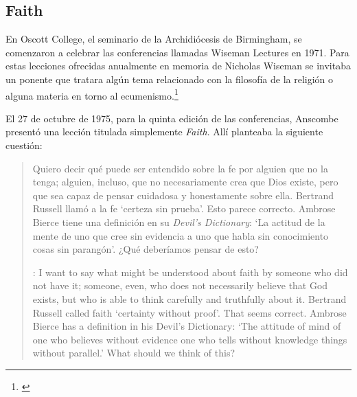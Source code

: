 \subsection{Faith}

En Oscott College, el seminario de la Archidiócesis de Birmingham, se comenzaron a celebrar las conferencias llamadas Wiseman Lectures en 1971. Para estas lecciones ofrecidas anualmente en memoria de Nicholas Wiseman se invitaba un ponente que tratara algún tema relacionado con la filosofía de la religión o alguna materia en torno al ecumenismo.\footnote{\cite[Cf.~][7]{wisemanlects}}

El 27 de octubre de 1975, para la quinta edición de las conferencias, Anscombe presentó una lección titulada simplemente \emph{Faith}. Allí planteaba la siguiente cuestión: \blockquote[{\cite[115]{anscombe1981erp:faith}}: I want to say what might be understood about faith by someone who did not have it; someone, even, who does not necessarily believe that God exists, but who is able to think carefully and truthfully about it. Bertrand Russell called faith `certainty without proof'. That seems correct. Ambrose Bierce has a definition in his Devil's Dictionary: `The attitude of mind of one who believes without evidence one who tells without knowledge things without parallel.' What should we think of this?]{Quiero decir qué puede ser entendido sobre la fe por alguien que no la tenga; alguien, incluso, que no necesariamente crea que Dios existe, pero que sea capaz de pensar cuidadosa y honestamente sobre ella. Bertrand Russell llamó a la fe `certeza sin prueba'. Esto parece correcto. Ambrose Bierce tiene una definición en su \emph{Devil's Dictionary}: `La actitud de la mente de uno que cree sin evidencia a uno que habla sin conocimiento cosas sin parangón'. ¿Qué deberíamos pensar de esto?}

